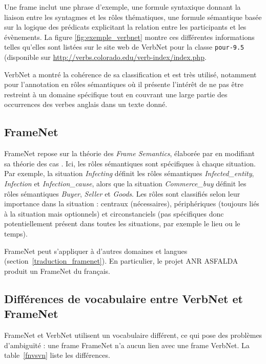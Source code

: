 Une frame inclut une phrase d'exemple, une formule syntaxique donnant la
liaison entre les syntagmes et les rôles thématiques, une formule sémantique
basée sur la logique des prédicats explicitant la relation entre les
participants et les évènements. La figure \ref{fig:exemple_verbnet} montre ces
différentes informations telles qu'elles sont listées sur le site web de
VerbNet pour la classe \texttt{pour-9.5} (disponible sur
\url{http://verbs.colorado.edu/verb-index/index.php}.


VerbNet a montré la cohérence de sa classification et est très utilisé,
notamment pour l'annotation en rôles sémantiques
\citep{swier2005exploiting,palmer2013semantic} où il présente l'intérêt de ne
pas être restreint à un domaine spécifique tout en couvrant une large partie
des occurrences des verbes anglais dans un texte donné.

\subsection{FrameNet}
\label{presentation_framenet}

FrameNet \citep{baker1998berkeley} repose sur la théorie des \textit{Frame
Semantics}, élaborée par \cite{fillmore1982frame} en modifiant sa théorie des
cas \citep{fillmore1968case}. Ici, les rôles sémantiques sont spécifiques à
chaque situation. Par exemple, la situation \textit{Infecting} définit les rôles
sémantiques \textit{Infected\_entity}, \textit{Infection} et
\textit{Infection\_cause}, alors que la situation \textit{Commerce\_buy} définit les
rôles sémantiques \textit{Buyer}, \textit{Seller} et \textit{Goods}. Les rôles sont
classifiés selon leur importance dans la situation : centraux (nécessaires),
périphériques (toujours liés à la situation mais optionnels) et circonstanciels
(pas spécifiques donc potentiellement présent dans toutes les situations, par
exemple le lieu ou le temps).

FrameNet peut s'appliquer à d'autres domaines et langues
(section~\ref{traduction_framenet}). En particulier, le projet ANR ASFALDA
produit un FrameNet du français.

\subsection{Différences de vocabulaire entre VerbNet et FrameNet}
\label{vocverbnetframenet}

FrameNet et VerbNet utilisent un vocabulaire différent, ce qui pose des
problèmes d'ambiguïté : une frame FrameNet n'a aucun lien avec une frame
VerbNet. La table~\ref{fnvsvn} liste les différences.

